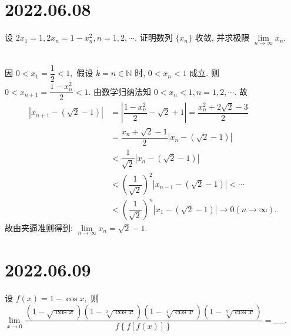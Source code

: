 \documentclass[lang=cn,12pt]{elegantbook}
\begin{document}
\newpage

\section*{2022.06.08}

设 $2x_{1} = 1, 2x_{n} = 1-x_{n}^2, n = 1, 2, \cdots.$
证明数列 $\{x_{n}\}$ 收敛, 并求极限 $\lim\limits_{n\to\infty} x_{n}.$
\\ \\

\begin{solution}
  因 $0 < x_{1} = \dfrac{1}{2} < 1,$ 假设 $k=n\in\mathbb{N}$ 时,
  $0 < x_{n} < 1$ 成立. 则 $0 < x_{n+1} = \dfrac{1-x_{n}^2}{2} < 1.$
  由数学归纳法知 $0 < x_{n} < 1, n = 1, 2, \cdots.$ 故
  $$\begin{aligned}
    \left| x_{n+1} - \left(\sqrt{2} - 1\right)\right| &=
    \left| \dfrac{1-x_{n}^2}{2} - \sqrt{2} + 1\right| = 
    \dfrac{x_{n}^2 + 2\sqrt{2} - 3}{2} \\ &= 
    \dfrac{x_{n} + \sqrt{2} - 1}{2}\left| x_{n} - \left(\sqrt{2} - 1\right)\right| \\ &<
    \dfrac{1}{\sqrt{2}}\left| x_{n} - \left(\sqrt{2} - 1\right)\right| \\ &<
    \left(\dfrac{1}{\sqrt{2}}\right)^2\left| x_{n-1} - \left(\sqrt{2} - 1\right)\right| < \cdots \\ & <
    \left(\dfrac{1}{\sqrt{2}}\right)^n\left| x_{1} - \left(\sqrt{2} - 1\right)\right| \to 0 (n\to\infty).
  \end{aligned}
  $$
  故由夹逼准则得到: $\lim\limits_{n\to\infty} x_{n} = \sqrt{2} - 1.$
\end{solution}

\section*{2022.06.09}

设 $f(x) = 1 - \cos x,$ 则 $\lim\limits_{x \to 0} 
  \dfrac{\left(1-\sqrt{\cos x}\right)\left(1-\sqrt[3]{\cos x}\right)
  \left(1-\sqrt[4]{\cos x}\right)\left(1-\sqrt[5]{\cos x}\right)}
  {f\left\{f\left[f\left(x\right)\right]\right\}}=\_\_\_\_.$
\\ \\
\end{document}
